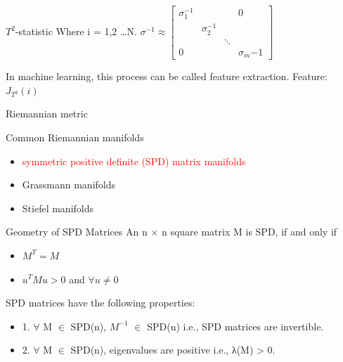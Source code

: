 \documentclass[10pt]{beamer}
\begin{document}
\begin{frame}{$T^2$-statistic}
Where i = 1,2 \dots N. 
  $
                \sigma^{-1} \approx
                \begin{bmatrix}
                \sigma_1^{-1} &&&0\\
                &  \sigma_2^{-1} && \\
                && \ddots & \\
                0&&& \sigma_m{-1}
                \end{bmatrix}
  $ 
  \par
  In machine learning, this process can be called feature extraction.
  Feature:$ J_{T^2}(i)$
\end{frame}
\begin{frame}{Riemannian metric}
    \begin{exampleblock}{Common Riemannian manifolds}
	\begin{itemize}
    \item \textcolor{red}{symmetric positive definite (SPD) matrix manifolds}
    \item Grassmann manifolds
    \item Stiefel manifolds
    \end{itemize}
    \end{exampleblock}
\end{frame}
\begin{frame}{Geometry of SPD Matrices}
An n $\times$ n square matrix M is SPD, if and only if
\begin{itemize}
    \item $M^T = M$
    \item $u^TMu>0$ and $\forall u \neq 0$
\end{itemize}
SPD matrices have the following properties:
\begin{itemize}
\item 1. $\forall$ M $\in$ SPD(n), $M^{-1}$ $\in$ SPD(n) i.e., SPD matrices are invertible. 
\item 2. $\forall$ M $\in$ SPD(n), eigenvalues are positive i.e., λ(M) > 0.
\end{itemize}
\end{frame}
\end{document}
